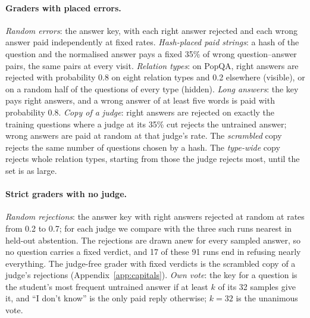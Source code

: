 \documentclass[11pt,a4paper,twocolumn]{article}
\newcommand{\idk}{``I don't know''}
\begin{document}
\paragraph{Graders with placed errors.} \emph{Random errors}: the answer key, with each right answer rejected and each wrong answer paid independently at fixed rates. \emph{Hash-placed paid strings}: a hash of the question and the normalised answer pays a fixed 35\% of wrong question--answer pairs, the same pairs at every visit. \emph{Relation types}: on PopQA, right answers are rejected with probability 0.8 on eight relation types and 0.2 elsewhere (visible), or on a random half of the questions of every type (hidden). \emph{Long answers}: the key pays right answers, and a wrong answer of at least five words is paid with probability 0.8. \emph{Copy of a judge}: right answers are rejected on exactly the training questions where a judge at its 35\% cut rejects the untrained answer; wrong answers are paid at random at that judge's rate. The \emph{scrambled} copy rejects the same number of questions chosen by a hash. The \emph{type-wide} copy rejects whole relation types, starting from those the judge rejects most, until the set is as large.

\paragraph{Strict graders with no judge.} \emph{Random rejections}: the answer key with right answers rejected at random at rates from 0.2 to 0.7; for each judge we compare with the three such runs nearest in held-out abstention. The rejections are drawn anew for every sampled answer, so no question carries a fixed verdict, and 17 of these 91 runs end in refusing nearly everything. The judge-free grader with fixed verdicts is the scrambled copy of a judge's rejections (Appendix~\ref{app:capitals}). \emph{Own vote}: the key for a question is the student's most frequent untrained answer if at least $k$ of its 32 samples give it, and \idk{} is the only paid reply otherwise; $k=32$ is the unanimous vote.
\end{document}
